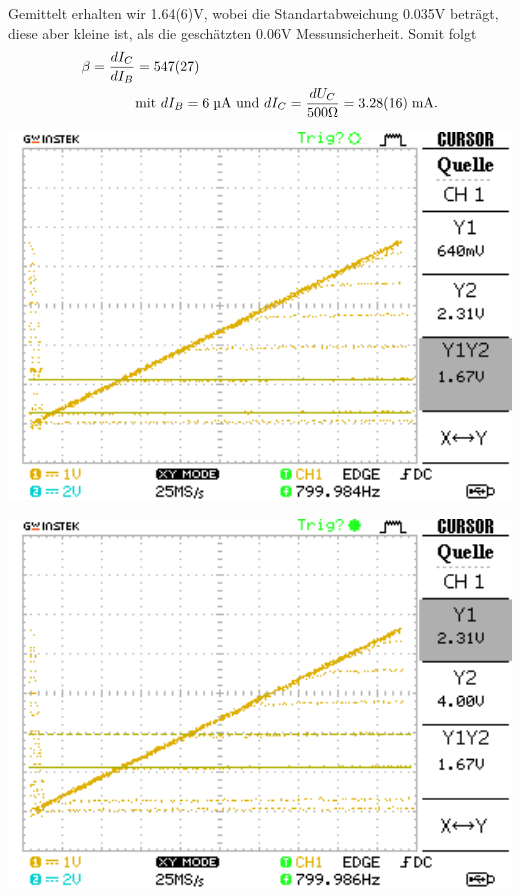 \documentclass[10pt]{article}
\newenvironment{Figure}
  {\par\medskip\noindent\minipage{\linewidth}}
  {\endminipage\par\medskip}
\begin{document}
\begin{multicols}{2}
	Gemittelt erhalten wir 1.64(6)\;V, wobei die Standartabweichung 0.035\;V beträgt, diese aber kleine ist, als die geschätzten 0.06\;V Messunsicherheit. Somit folgt
	\begin{align*}
		\beta = \frac{dI_C}{dI_B} & = 547(27)                                                                                \\
		                          & \text{mit } dI_B = 6\text{\;µA und }dI_C=\frac{dU_C}{500 \Omega} = 3.28(16) \text{\;mA.}
	\end{align*}
	\begin{Figure}
		\centering\includegraphics[width=1\textwidth]{data/Kennlinie1_npn.png}
		\label{fig:1.2}
	\end{Figure}
	\begin{Figure}
		\centering\includegraphics[width=1\textwidth]{data/Kennlinie2_npn.png}

\end{Figure}
\end{multicols}
\end{document}
